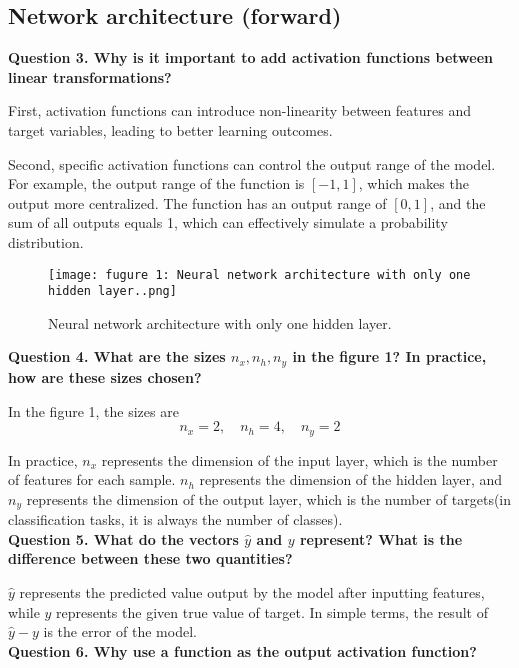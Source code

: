 \documentclass{article}
\begin{document}
\subsection{Network architecture (forward)}

\noindent \textbf{Question 3. Why is it important to add activation functions between linear transformations?}

First, activation functions can introduce non-linearity between features and target variables, leading to better learning outcomes.

Second, specific activation functions can control the output range of the model. For example, the output range of the  function is \([-1, 1]\), which makes the output more centralized. The  function has an output range of \([0, 1]\), and the sum of all outputs equals 1, which can effectively simulate a probability distribution.

\begin{figure}[H]
    \centering
    \texttt{[image: fugure 1: Neural network architecture with only one hidden layer..png]}
    \caption{Neural network architecture with only one hidden layer.}
    \label{fig:figure 1}
\end{figure}

\noindent \textbf{Question 4. What are the sizes \(n_x, n_h, n_y\) in the figure 1? In practice, how are these sizes chosen?}

In the figure 1, the sizes are
\[
n_x = 2, \quad n_h = 4, \quad n_y = 2
\]

In practice, \(n_x\) represents the dimension of the input layer, which is the number of features for each sample. \(n_h\) represents the dimension of the hidden layer, and \(n_y\) represents the dimension of the output layer, which is the number of targets(in classification tasks, it is always the number of classes).\\

\noindent \textbf{Question 5. What do the vectors \(\hat{y}\) and \(y\) represent? What is the difference between these two quantities?}

\(\hat{y}\) represents the predicted value output by the model after inputting features, while \(y\) represents the given true value of target. In simple terms, the result of \(\hat{y} - y\) is the error of the model.\\

\noindent \textbf{Question 6. Why use a  function as the output activation function?}
\end{document}
